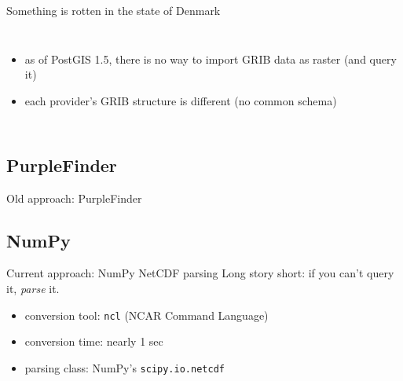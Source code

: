 \documentclass[xcolor=svgnames]{beamer}
\begin{document}
\begin{frame}{Something is rotten in the state of Denmark}
\begin{columns}[c]
{\begin{itemize}
                        \item as of PostGIS 1.5, there is no way to import GRIB data as raster (and query it)
                        \item each provider's GRIB structure is different (no common schema)\\\vspace{0.1\textheight}
                    \end{itemize}
                }
            \end{columns}
        \end{frame}

    \subsection{PurpleFinder}

        \begin{frame}{Old approach: PurpleFinder}
        \end{frame}

    \subsection{NumPy}

        \begin{frame}{Current approach: NumPy NetCDF parsing}
            Long story short: if you can't query it, \textit{parse} it.
            \vfill
            \begin{center}
                \resizebox{0.9\textwidth}{!}{%
                    \begin{tikzpicture}
                        
                    \end{tikzpicture}
                }
            \end{center}
            \vfill
            \pause
            \begin{itemize}
                \item conversion tool: \texttt{ncl} (NCAR Command Language)
                \item conversion time: nearly 1 sec
                \item parsing class: NumPy's \texttt{scipy.io.netcdf}
            \end{itemize}
        \end{frame}
\end{document}
